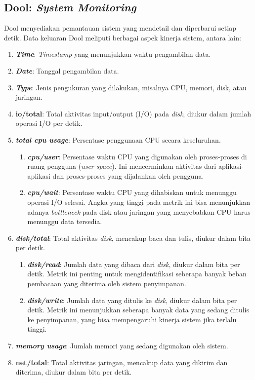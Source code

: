 \subsection{Dool: \textit{System Monitoring}}
Dool menyediakan pemantauan sistem yang mendetail dan diperbarui setiap detik. Data keluaran Dool meliputi berbagai aspek kinerja sistem, antara lain:
\begin{enumerate}
	\item \textbf{\textit{Time}}: \textit{Timestamp} yang menunjukkan waktu pengambilan data.
	\item \textbf{\textit{Date}}: Tanggal pengambilan data. 
	\item \textbf{\textit{Type}}: Jenis pengukuran yang dilakukan, misalnya CPU, memori, disk, atau jaringan. 
	\item \textbf{io/total}: Total aktivitas input/output (I/O) pada \textit{disk}, diukur dalam jumlah operasi I/O per detik.
	\item \textbf{\textit{total cpu usage}}: Persentase penggunaan CPU secara keseluruhan. 
		\begin{enumerate}
		\item \textbf{\textit{cpu/user}}: Persentase waktu CPU yang digunakan oleh proses-proses di ruang pengguna (\textit{user space}). Ini mencerminkan aktivitas dari aplikasi-aplikasi dan proses-proses yang dijalankan oleh pengguna.
		\item \textbf{\textit{cpu/wait}}: Persentase waktu CPU yang dihabiskan untuk menunggu operasi I/O selesai. Angka yang tinggi pada metrik ini bisa menunjukkan adanya \textit{bottleneck} pada disk atau jaringan yang menyebabkan CPU harus menunggu data tersedia.
		\end{enumerate}
	\item \textbf{\textit{disk/total}}: Total aktivitas \textit{disk}, mencakup baca dan tulis, diukur dalam bita per detik.
		\begin{enumerate}
		\item \textbf{\textit{disk/read}}: Jumlah data yang dibaca dari \textit{disk}, diukur dalam bita per detik. Metrik ini penting untuk mengidentifikasi seberapa banyak beban pembacaan yang diterima oleh sistem penyimpanan.
		\item \textbf{\textit{disk/write}}: Jumlah data yang ditulis ke \textit{disk}, diukur dalam bita per detik. Metrik ini menunjukkan seberapa banyak data yang sedang ditulis ke penyimpanan, yang bisa mempengaruhi kinerja sistem jika terlalu tinggi.
		\end{enumerate}
	\item \textbf{\textit{memory usage}}: Jumlah memori yang sedang digunakan oleh sistem.
	\item \textbf{net/total}: Total aktivitas jaringan, mencakup data yang dikirim dan diterima, diukur dalam bita per detik.
\end{enumerate}

